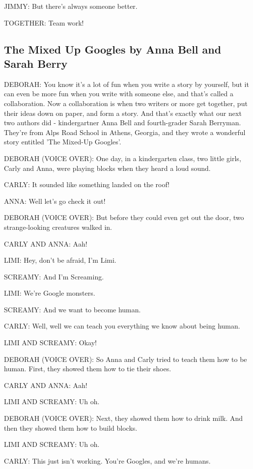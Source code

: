 JIMMY:
But there's always someone better.

TOGETHER:
Team work!

\subsection{The Mixed Up Googles by Anna Bell and Sarah Berry}

DEBORAH:
You know it's a lot of fun when you write a story by yourself, but it can even be more fun when you write with someone else, and that's called a collaboration.
Now a collaboration is when two writers or more get together, put their ideas down on paper, and form a story.
And that's exactly what our next two authors did - kindergartner Anna Bell and fourth-grader Sarah Berryman.
They're from Alps Road School in Athens, Georgia, and they wrote a wonderful story entitled 'The Mixed-Up Googles'.

DEBORAH (VOICE OVER):
One day, in a kindergarten class, two little girls, Carly and Anna, were playing blocks when they heard a loud sound.

CARLY:
It sounded like something landed on the roof!

ANNA:
Well let's go check it out!

DEBORAH (VOICE OVER):
But before they could even get out the door, two strange-looking creatures walked in.

CARLY AND ANNA:
Aah!

LIMI:
Hey, don't be afraid, I'm Limi.

SCREAMY:
And I'm Screaming.

LIMI:
We're Google monsters.

SCREAMY:
And we want to become human.

CARLY:
Well, well we can teach you everything we know about being human.

LIMI AND SCREAMY:
Okay!

DEBORAH (VOICE OVER):
So Anna and Carly tried to teach them how to be human.
First, they showed them how to tie their shoes.

CARLY AND ANNA:
Aah!

LIMI AND SCREAMY:
Uh oh.

DEBORAH (VOICE OVER):
Next, they showed them how to drink milk.
And then they showed them how to build blocks.

LIMI AND SCREAMY:
Uh oh.

CARLY:
This just isn't working.
You're Googles, and we're humans.

